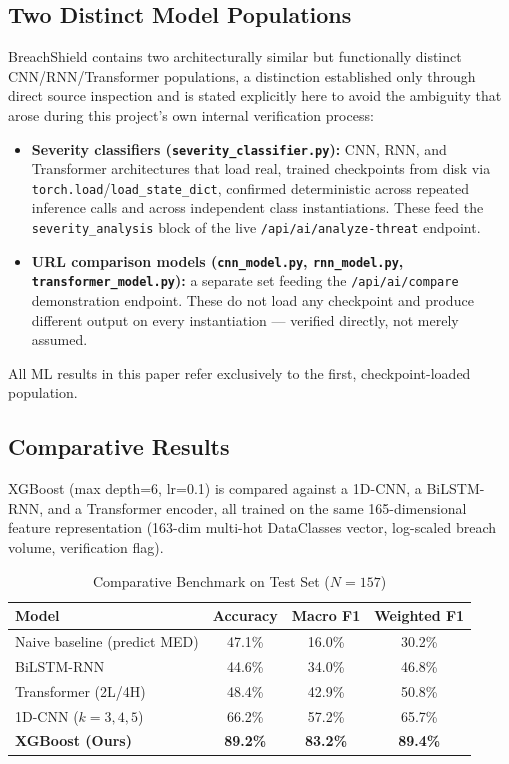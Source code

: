 \documentclass[conference]{IEEEtran}
\begin{document}
\subsection{Two Distinct Model Populations}
BreachShield contains two architecturally similar but functionally distinct CNN/RNN/Transformer populations, a distinction established only through direct source inspection and is stated explicitly here to avoid the ambiguity that arose during this project's own internal verification process:
\begin{itemize}
    \item \textbf{Severity classifiers (\texttt{severity\_classifier.py}):} CNN, RNN, and Transformer architectures that load real, trained checkpoints from disk via \texttt{torch.load}/\texttt{load\_state\_dict}, confirmed deterministic across repeated inference calls and across independent class instantiations. These feed the \texttt{severity\_analysis} block of the live \texttt{/api/ai/analyze-threat} endpoint.
    \item \textbf{URL comparison models (\texttt{cnn\_model.py}, \texttt{rnn\_model.py}, \texttt{transformer\_model.py}):} a separate set feeding the \texttt{/api/ai/compare} demonstration endpoint. These do not load any checkpoint and produce different output on every instantiation --- verified directly, not merely assumed.
\end{itemize}
All ML results in this paper refer exclusively to the first, checkpoint-loaded population.

\subsection{Comparative Results}
XGBoost \cite{chen2016xgboost} (max depth=6, lr=0.1) is compared against a 1D-CNN, a BiLSTM-RNN, and a Transformer encoder, all trained on the same 165-dimensional feature representation (163-dim multi-hot DataClasses vector, log-scaled breach volume, verification flag).

\begin{table}[htbp]
\caption{Comparative Benchmark on Test Set ($N=157$)}
\label{tab:models}
\centering
\scriptsize
\begin{tabular}{lccc}
\toprule
\textbf{Model} & \textbf{Accuracy} & \textbf{Macro F1} & \textbf{Weighted F1} \\
\midrule
Naive baseline (predict MED) & 47.1\% & 16.0\% & 30.2\% \\
BiLSTM-RNN & 44.6\% & 34.0\% & 46.8\% \\
Transformer (2L/4H) & 48.4\% & 42.9\% & 50.8\% \\
1D-CNN ($k=3,4,5$) & 66.2\% & 57.2\% & 65.7\% \\
\textbf{XGBoost (Ours)} & \textbf{89.2\%} & \textbf{83.2\%} & \textbf{89.4\%} \\
\bottomrule
\end{tabular}
\end{table}
\end{document}
